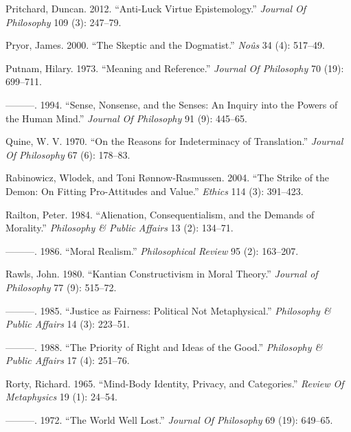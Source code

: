 \documentclass[
  10pt,
  letterpaper,
  DIV=11,
  numbers=noendperiod,
  twoside]{scrartcl}
\newlength{\cslhangindent}
\newenvironment{CSLReferences}[2] %
 {\begin{list}{}{%
  \setlength{\itemindent}{0pt}
  \setlength{\leftmargin}{0pt}
  \setlength{\parsep}{0pt}
  \ifodd #1
   \setlength{\leftmargin}{\cslhangindent}
   \setlength{\itemindent}{-1\cslhangindent}
  \fi
  \setlength{\itemsep}{#2\baselineskip}}}
 {\end{list}}
\begin{document}
\begin{CSLReferences}{1}{0}
Pritchard, Duncan. 2012. {``Anti-Luck Virtue Epistemology.''}
\emph{Journal Of Philosophy} 109 (3): 247--79.

Pryor, James. 2000. {``The Skeptic and the Dogmatist.''} \emph{Noûs} 34
(4): 517--49.

Putnam, Hilary. 1973. {``Meaning and Reference.''} \emph{Journal Of
Philosophy} 70 (19): 699--711.

---------. 1994. {``Sense, Nonsense, and the Senses: An Inquiry into the
Powers of the Human Mind.''} \emph{Journal Of Philosophy} 91 (9):
445--65.

Quine, W. V. 1970. {``On the Reasons for Indeterminacy of
Translation.''} \emph{Journal Of Philosophy} 67 (6): 178--83.

Rabinowicz, Wlodek, and Toni Rønnow‐Rasmussen. 2004. {``The Strike of
the Demon: On Fitting Pro-Attitudes and Value.''} \emph{Ethics} 114 (3):
391--423.

Railton, Peter. 1984. {``Alienation, Consequentialism, and the Demands
of Morality.''} \emph{Philosophy \& Public Affairs} 13 (2): 134--71.

---------. 1986. {``Moral Realism.''} \emph{Philosophical Review} 95
(2): 163--207.

Rawls, John. 1980. {``Kantian Constructivism in Moral Theory.''}
\emph{Journal of Philosophy} 77 (9): 515--72.

---------. 1985. {``Justice as Fairness: Political Not Metaphysical.''}
\emph{Philosophy \& Public Affairs} 14 (3): 223--51.

---------. 1988. {``The Priority of Right and Ideas of the Good.''}
\emph{Philosophy \& Public Affairs} 17 (4): 251--76.

Rorty, Richard. 1965. {``Mind-Body Identity, Privacy, and Categories.''}
\emph{Review Of Metaphysics} 19 (1): 24--54.

---------. 1972. {``The World Well Lost.''} \emph{Journal Of Philosophy}
69 (19): 649--65.


\end{CSLReferences}
\end{document}
